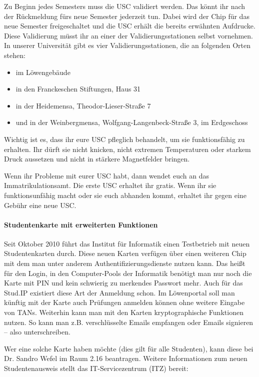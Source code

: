 Zu Beginn jedes Semesters muss die USC validiert werden. Das könnt ihr nach der Rückmeldung fürs neue Semester jederzeit tun.
Dabei wird der Chip für das neue Semester freigeschaltet und die USC erhält die bereits erwähnten Aufdrucke.
Diese Validierung müsst ihr an einer der Validierungsstationen selbst vornehmen.
In unserer Universität gibt es vier Validierungsstationen, die an folgenden Orten stehen:

\begin{itemize}
    \item im Löwengebäude
    \item in den Franckeschen Stiftungen, Haus 31
    \item in der Heidemensa, Theodor-Lieser-Straße 7
    \item und in der Weinbergmensa, Wolfgang-Langenbeck-Straße 3, im Erdgeschoss
    
\end{itemize}

Wichtig ist es, dass ihr eure USC pfleglich behandelt, um sie funktionsfähig zu erhalten.
Ihr dürft sie nicht knicken, nicht extremen Temperaturen oder starkem Druck aussetzen und nicht in stärkere Magnetfelder bringen.

Wenn ihr Probleme mit eurer USC habt, dann wendet euch an das Immatrikulationsamt.
Die erste USC erhaltet ihr gratis.
Wenn ihr sie funktionsunfähig macht oder sie euch abhanden kommt, erhaltet ihr gegen eine Gebühr eine neue USC.

\paragraph{Studentenkarte mit erweiterten Funktionen}

Seit Oktober 2010 führt das Institut für Informatik einen Testbetrieb mit neuen Studentenkarten durch.
Diese neuen Karten verfügen über einen weiteren Chip mit dem man unter anderem Authentifizierungsdienste nutzen kann.
Das heißt für den Login, in den Computer-Pools der Informatik benötigt man nur noch die Karte mit PIN und kein schwierig zu merkendes Passwort mehr.
Auch für das Stud.IP existiert diese Art der Anmeldung schon.
Im Löwenportal soll man künftig mit der Karte auch Prüfungen anmelden können ohne weitere Eingabe von TANs.
Weiterhin kann man mit den Karten kryptographische Funktionen nutzen.
So kann man z.B. verschlüsselte Emails empfangen oder Emails signieren -- also unterschreiben.

Wer eine solche Karte haben möchte (dies gilt für alle Studenten), kann diese bei Dr. Sandro Wefel im Raum 2.16 beantragen.
Weitere Informationen zum neuen Studentenausweis stellt das IT-Servicezentrum (ITZ) bereit:\\[1.0em]


